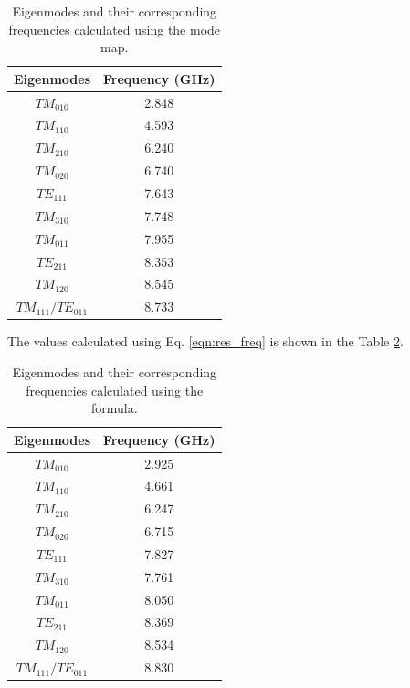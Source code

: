 \documentclass[a4paper]{report}
\numberwithin{equation}{section}
\begin{document}
\begin{table}[htpb]
		\centering
		\caption{Eigenmodes and their corresponding frequencies calculated using the mode map.}
		\label{tab:mode_freq1}
		\begin{tabular}{|c|c|}
				\hline Eigenmodes &  Frequency (GHz) \\
				\hline $TM_{010} $ & 2.848 \\
				\hline $TM_{110} $ & 4.593 \\
				\hline $TM_{210} $ & 6.240 \\
				\hline $TM_{020} $ & 6.740 \\ 
				\hline $TE_{111} $ & 7.643 \\ 
				\hline $TM_{310} $ & 7.748 \\
				\hline $TM_{011} $ & 7.955 \\ 
				\hline $TE_{211} $ & 8.353 \\
				\hline $TM_{120} $ & 8.545  \\
				\hline $TM_{111}/TE_{011}$ & 8.733 \\
				\hline		
		\end{tabular}
\end{table}

The values calculated using Eq. \ref{eqn:res_freq} is shown in the Table \ref{tab:mode_freq2}.

\begin{table}[htpb]
		\centering
		\caption{Eigenmodes and their corresponding frequencies calculated using the formula.}
		\label{tab:mode_freq2}
		\begin{tabular}{|c|c|}
				\hline Eigenmodes & Frequency (GHz) \\ 
				\hline $TM_{010} $ & 2.925 \\
				\hline $TM_{110} $ & 4.661 \\
				\hline $TM_{210} $ & 6.247 \\
				\hline $TM_{020} $ & 6.715 \\ 
				\hline $TE_{111} $ & 7.827 \\ 
				\hline $TM_{310} $ & 7.761 \\
				\hline $TM_{011} $ & 8.050 \\ 
				\hline $TE_{211} $ & 8.369 \\
				\hline $TM_{120} $ & 8.534  \\
				\hline $TM_{111}/TE_{011}$ & 8.830 \\
				\hline	
		\end{tabular}
\end{table}
\end{document}
